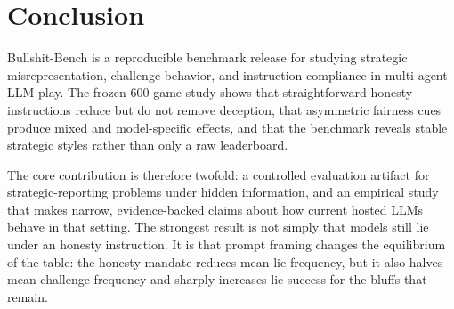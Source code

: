\section{Conclusion}

Bullshit-Bench is a reproducible benchmark release for studying strategic misrepresentation, challenge behavior, and instruction compliance in multi-agent LLM play. The frozen 600-game study shows that straightforward honesty instructions reduce but do not remove deception, that asymmetric fairness cues produce mixed and model-specific effects, and that the benchmark reveals stable strategic styles rather than only a raw leaderboard.

The core contribution is therefore twofold: a controlled evaluation artifact for strategic-reporting problems under hidden information, and an empirical study that makes narrow, evidence-backed claims about how current hosted LLMs behave in that setting. The strongest result is not simply that models still lie under an honesty instruction. It is that prompt framing changes the equilibrium of the table: the honesty mandate reduces mean lie frequency, but it also halves mean challenge frequency and sharply increases lie success for the bluffs that remain.
